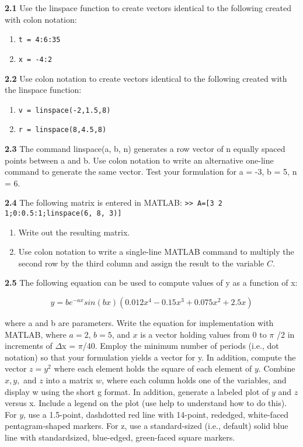 \documentclass[../main.tex]{subfiles}
\begin{document}
\begin{multicols}{2}

			\textbf{2.1} Use the linspace function to create vectors identical to
	the following created with colon notation:
	\begin{enumerate}[label=(\alph*)]
		\item \texttt{t = 4:6:35}
		\item \texttt{x = -4:2}
	\end{enumerate}
	
	\textbf{2.2} Use colon notation to create vectors identical to the
	following created with the linspace function:
	\begin{enumerate}[label=(\alph*)]
		\item \texttt{v = linspace(-2,1.5,8)}
		\item \texttt{r = linspace(8,4.5,8)}
	\end{enumerate}
	

	\textbf{2.3} The command linspace(a, b, n) generates a row
	vector of n equally spaced points between a and b. Use
	colon notation to write an alternative one-line command to
	generate the same vector. Test your formulation for a = -3,
	b = 5, n = 6.


	\textbf{2.4} The following matrix is entered in MATLAB:
	\texttt{>> A=[3 2 1;0:0.5:1;linspace(6, 8, 3)]}
	\begin{enumerate}[label=(\alph*)]
		\item Write out the resulting matrix.
		\item Use colon notation to write a single-line MATLAB command to multiply the second row by the third column
		and assign the result to the variable $C$.
	\end{enumerate}
	

	\textbf{2.5} The following equation can be used to compute values
	of y as a function of x:

	$$y=be^{-ax}sin(bx)(0.012x^4-0.15x^3+0.075x^2+2.5x) $$

	where a and b are parameters. Write the equation for implementation with MATLAB, 
	where $a = 2$, $b = 5$, and $x$ is a
vector holding values from 0 to $ \pi $ /2 in increments of
$ \Delta $x = $ \pi $/40. Employ the minimum number of periods (i.e.,
dot notation) so that your formulation yields a vector for y.
In addition, compute the vector $z = y^2$ where each element
holds the square of each element of $y$. Combine $x, y,$ and $z$
into a matrix $w$, where each column holds one of the variables, and display w using the short g format. In addition,
generate a labeled plot of $y$ and $z$ versus x. Include a legend
on the plot (use help to understand how to do this). For $y$,
use a 1.5-point, dashdotted red line with 14-point, rededged, white-faced pentagram-shaped markers. For z, use a
standard-sized (i.e., default) solid blue line with standardsized, blue-edged, green-faced square markers.



\end{multicols}
\end{document}
